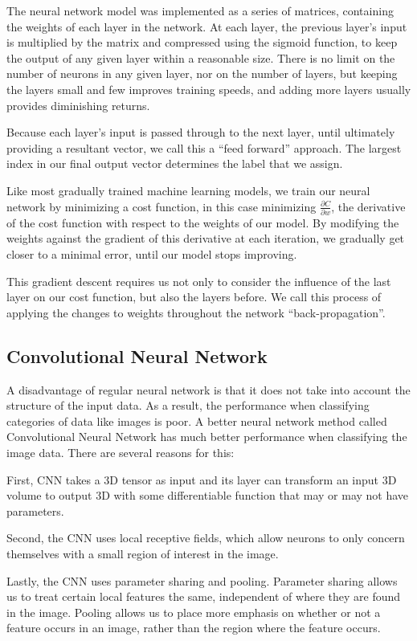 \documentclass[conference]{IEEEtran}
\begin{document}
The neural network model was implemented as a series of matrices, containing the weights of each layer in the network. At each layer, the previous layer's input is multiplied by the matrix and compressed using the sigmoid function, to keep the output of any given layer within a reasonable size. There is no limit on the number of neurons in any given layer, nor on the number of layers, but keeping the layers small and few improves training speeds, and adding more layers usually provides diminishing returns.

Because each layer's input is passed through to the next layer, until ultimately providing a resultant vector, we call this a ``feed forward'' approach. The largest index in our final output vector determines the label that we assign.

Like most gradually trained machine learning models, we train our neural network by minimizing a cost function, in this case minimizing $\frac{\partial C}{\partial w}$, the derivative of the cost function with respect to the weights of our model. By modifying the weights against the gradient of this derivative at each iteration, we gradually get closer to a minimal error, until our model stops improving. 

This gradient descent requires us not only to consider the influence of the last layer on our cost function, but also the layers before. We call this process of applying the changes to weights throughout the network ``back-propagation''.

\subsection{Convolutional Neural Network}

A disadvantage of regular neural network is that it does not take into account the structure of the input data. As a result, the performance when classifying categories of data like images is poor. 
A better neural network method called Convolutional Neural Network has much better performance when classifying the image data. There are several reasons for this:

First, CNN takes a 3D tensor as input and its layer can transform an input 3D volume to output 3D with some differentiable function that may or may not have parameters. 

Second, the CNN uses local receptive fields, which allow neurons to only concern themselves with a small region of interest in the image. 

Lastly, the CNN uses parameter sharing and pooling. Parameter sharing allows us to treat certain local features the same, independent of where they are found in the image. Pooling allows us to place more emphasis on whether or not a feature occurs in an image, rather than the region where the feature occurs.
\end{document}
